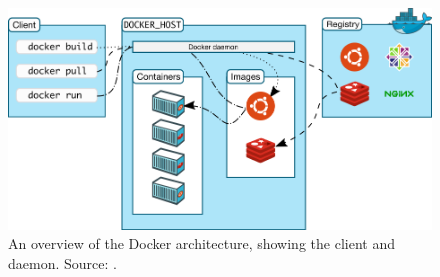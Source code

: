 \begin{figure}[H]
\caption{An overview of the Docker architecture, showing the client and daemon. Source: \cite{dockerarchi}.}
\centering
\includegraphics[scale=0.4]{4-softwarearch/images/architecture.png}
\end{figure}

